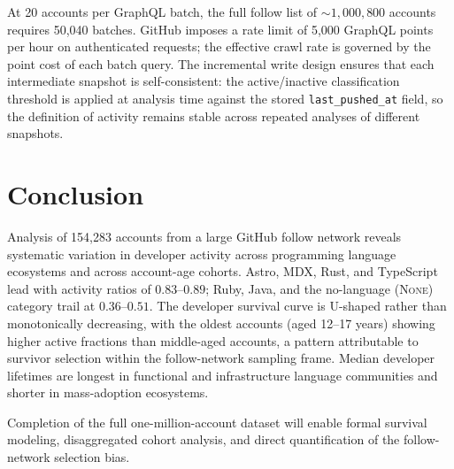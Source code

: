 \documentclass[12pt,a4paper]{article}
\begin{document}
At 20 accounts per GraphQL batch, the full follow list of $\sim1{,}000{,}800$
accounts requires 50,040 batches. GitHub imposes a rate limit of 5,000 GraphQL
points per hour on authenticated requests; the effective crawl rate is governed
by the point cost of each batch query. The incremental write design ensures that
each intermediate snapshot is self-consistent: the active/inactive classification
threshold is applied at analysis time against the stored
\texttt{last\_pushed\_at} field, so the definition of activity remains stable
across repeated analyses of different snapshots.

\section{Conclusion}

Analysis of 154,283 accounts from a large GitHub follow network reveals
systematic variation in developer activity across programming language ecosystems
and across account-age cohorts. Astro, MDX, Rust, and TypeScript lead with
activity ratios of $0.83$--$0.89$; Ruby, Java, and the no-language
(\textsc{None}) category trail at $0.36$--$0.51$. The developer survival curve
is U-shaped rather than monotonically decreasing, with the oldest accounts (aged
12--17 years) showing higher active fractions than middle-aged accounts, a
pattern attributable to survivor selection within the follow-network sampling
frame. Median developer lifetimes are longest in functional and infrastructure
language communities and shorter in mass-adoption ecosystems.

Completion of the full one-million-account dataset will enable formal survival
modeling, disaggregated cohort analysis, and direct quantification of the
follow-network selection bias.
\end{document}
